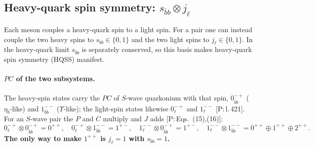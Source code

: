 \documentclass[11pt,a4paper]{article}
\newcommand{\tagP}[1]{\textcolor{blue!65!black}{\textsf{\small[P:\,#1]}}}
\begin{document}
\subsection{Heavy-quark spin symmetry: $s_{\bar bb}\otimes j_\ell$}
\label{sec:qn-hqss}

Each meson couples a heavy-quark spin to a light spin. For a pair one can instead couple the two heavy spins to $s_{\bar bb}\in\{0,1\}$ and the two light spins to $j_\ell\in\{0,1\}$. In the heavy-quark limit $s_{\bar bb}$ is separately conserved, so this basis makes heavy-quark spin symmetry (HQSS) manifest.

\paragraph{$PC$ of the two subsystems.} The heavy-spin states carry the $PC$ of $S$-wave quarkonium with that spin, $0_{\bar bb}^{-+}$ ($\eta_b$-like) and $1_{\bar bb}^{--}$ ($\Upsilon$-like); the light-spin states likewise $0_\ell^{-+}$ and $1_\ell^{--}$ \tagP{l.\,421}. For an $S$-wave pair the $P$ and $C$ multiply and $J$ adds \tagP{Eqs.~(15),(16)}:
\begin{equation}
0_\ell^{-+}\otimes0_{\bar bb}^{-+}=0^{++},\quad
0_\ell^{-+}\otimes1_{\bar bb}^{--}=1^{+-},\quad
1_\ell^{--}\otimes0_{\bar bb}^{-+}=1^{+-},\quad
1_\ell^{--}\otimes1_{\bar bb}^{--}=0^{++}\oplus1^{++}\oplus2^{++}.
\end{equation}
\textbf{The only way to make $1^{++}$ is $j_\ell=1$ with $s_{\bar bb}=1$.}
\end{document}

